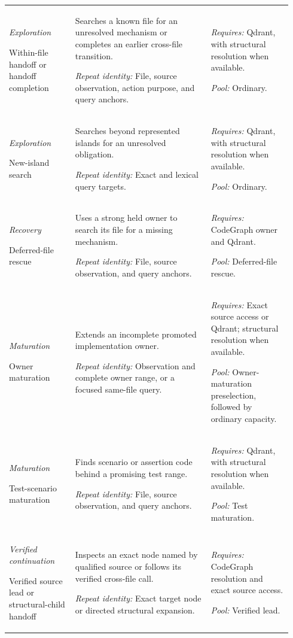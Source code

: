 \begin{longtable}{@{}L{0.22\linewidth}L{0.45\linewidth}L{0.27\linewidth}@{}}
\textit{Exploration}\par
Within-file handoff or handoff completion
&
Searches a known file for an unresolved mechanism or completes an earlier cross-file transition.
\par\textit{Repeat identity:} File, source observation, action purpose, and query anchors.
&
\textit{Requires:} Qdrant, with structural resolution when available.
\par\textit{Pool:} Ordinary.
\\

\textit{Exploration}\par
New-island search
&
Searches beyond represented islands for an unresolved obligation.
\par\textit{Repeat identity:} Exact and lexical query targets.
&
\textit{Requires:} Qdrant, with structural resolution when available.
\par\textit{Pool:} Ordinary.
\\

\textit{Recovery}\par
Deferred-file rescue
&
Uses a strong held owner to search its file for a missing mechanism.
\par\textit{Repeat identity:} File, source observation, and query anchors.
&
\textit{Requires:} CodeGraph owner and Qdrant.
\par\textit{Pool:} Deferred-file rescue.
\\

\textit{Maturation}\par
Owner maturation
&
Extends an incomplete promoted implementation owner.
\par\textit{Repeat identity:} Observation and complete owner range, or a focused same-file query.
&
\textit{Requires:} Exact source access or Qdrant; structural resolution when available.
\par\textit{Pool:} Owner-maturation preselection, followed by ordinary capacity.
\\

\textit{Maturation}\par
Test-scenario maturation
&
Finds scenario or assertion code behind a promising test range.
\par\textit{Repeat identity:} File, source observation, and query anchors.
&
\textit{Requires:} Qdrant, with structural resolution when available.
\par\textit{Pool:} Test maturation.
\\

\textit{Verified continuation}\par
Verified source lead or structural-child handoff
&
Inspects an exact node named by qualified source or follows its verified cross-file call.
\par\textit{Repeat identity:} Exact target node or directed structural expansion.
&
\textit{Requires:} CodeGraph resolution and exact source access.
\par\textit{Pool:} Verified lead.
\\

\end{longtable}
\endgroup

